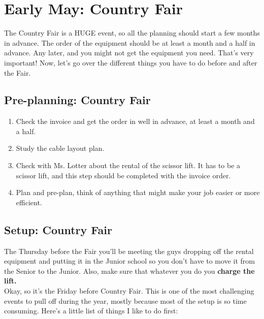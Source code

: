 \documentclass[11pt,a4paper]{book}
\begin{document}
\chapter{Early May: Country Fair}
The Country Fair is a HUGE event, so all the planning should start a few months in advance. The order of the equipment should be at least a month and a half in advance. Any later, and you might not get the equipment you need. That's very important! Now, let's go over the different things you have to do before and after the Fair.

\section{Pre-planning: Country Fair}
\begin{enumerate}
\item Check the invoice and get the order in well in advance, at least a month and a half.
\item Study the cable layout plan.
\item Check with Ms. Lotter about the rental of the scissor lift. It has to be a scissor lift, and this step should be completed with the invoice order.
\item Plan and pre-plan, think of anything that might make your job easier or more efficient.
\end{enumerate}

\section{Setup: Country Fair}
The Thursday before the Fair you'll be meeting the guys dropping off the rental equipment and putting it in the Junior school so you don't have to move it from the Senior to the Junior. Also, make sure that whatever you do you \textbf{charge the lift.}\\

Okay, so it's the Friday before Country Fair. This is one of the most challenging events to pull off during the year, mostly because most of the setup is so time consuming. Here's a little list of things I like to do first:
\end{document}
